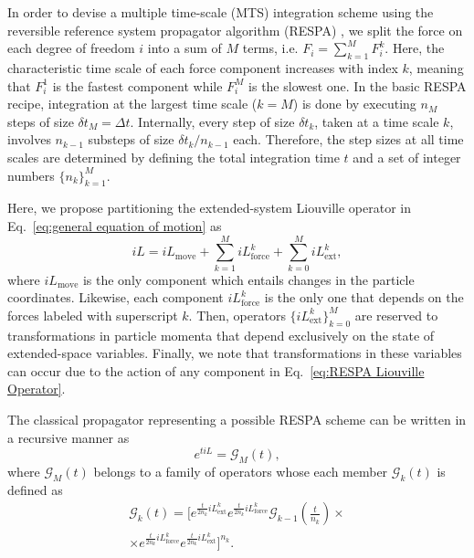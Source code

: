 \documentclass[
    journal=jctcce,
    layout=twocolumn
]{achemso}
\newcommand{\dof}{i}   %
\newcommand{\Liu}{i\!L}
\begin{document}
In order to devise a multiple time-scale (MTS) integration scheme using the reversible reference system propagator algorithm (RESPA) \cite{Tuckerman_1992}, we split the force on each degree of freedom $\dof$ into a sum of $M$ terms, i.e. $F_\dof = \sum_{k=1}^M F_\dof^k$.
Here, the characteristic time scale of each force component increases with index $k$, meaning that $F_\dof^1$ is the fastest component while $F_\dof^M$ is the slowest one.
In the basic RESPA recipe, integration at the largest time scale ($k=M$) is done by executing $n_M$ steps of size $\delta t_M = \Delta t$.
Internally, every step of size $\delta t_k$, taken at a time scale $k$, involves $n_{k-1}$ substeps of size $\delta t_k/n_{k-1}$ each.
Therefore, the step sizes at all time scales are determined by defining the total integration time $t$ and a set of integer numbers $\{n_k\}_{k=1}^M$.

Here, we propose partitioning the extended-system Liouville operator in Eq.~\eqref{eq:general equation of motion} as
\begin{equation}
\label{eq:RESPA Liouville Operator}
\Liu = \Liu_\mathrm{move} + \sum_{k=1}^M \Liu_\mathrm{force}^k + \sum_{k=0}^M \Liu_\mathrm{ext}^k,
\end{equation}
where $\Liu_\mathrm{move}$ is the only component which entails changes in the particle coordinates.
Likewise, each component $\Liu_\mathrm{force}^k$ is the only one that depends on the forces labeled with superscript $k$.
Then, operators $\{\Liu_\mathrm{ext}^k\}_{k=0}^M$ are reserved to transformations in particle momenta that depend exclusively on the state of extended-space variables.
Finally, we note that transformations in these variables can occur due to the action of any component in Eq.~\eqref{eq:RESPA Liouville Operator}.

The classical propagator representing a possible RESPA scheme can be written in a recursive manner as
\begin{equation}
\label{eq:RESPA outermost propagator}
e^{t \Liu} = \mathcal{G}_M(t),
\end{equation}
where $\mathcal{G}_M(t)$ belongs to a family of operators whose each member $\mathcal{G}_k(t)$ is defined as
\begin{multline}
\label{eq:RESPA scheme 1}
\mathcal{G}_k(t) = \Big[e^{\frac{t}{2 n_k} \Liu_\mathrm{ext}^k}
e^{\frac{t}{2 n_k} \Liu_\mathrm{force}^k}
\mathcal{G}_{k-1}\left(\tfrac{t}{n_k}\right) \times \\
\times e^{\frac{t}{2 n_k} \Liu_\mathrm{force}^k}
e^{\frac{t}{2 n_k} \Liu_\mathrm{ext}^k}
\Big]^{n_k}.
\end{multline}
\end{document}
